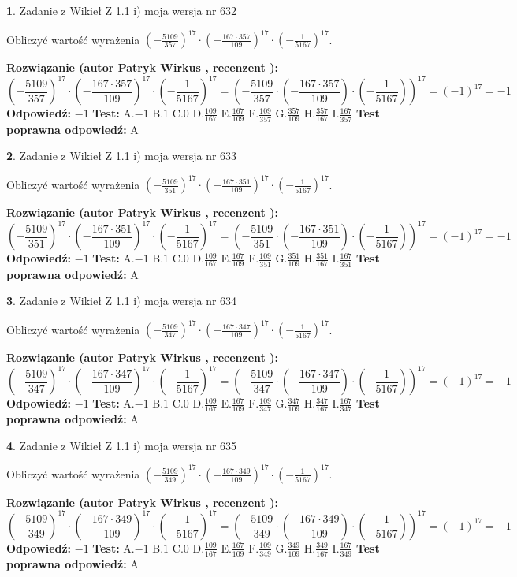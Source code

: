 \documentclass[12pt, a4paper]{article}
\theoremstyle{definition} %
\newtheorem{zad}{}
\newcommand{\zadStart}[1]{\begin{zad}#1\newline}
\newcommand{\zadStop}{\end{zad}}
\newcommand{\rozwStart}[2]{\noindent \textbf{Rozwiązanie (autor #1 , recenzent #2): }\newline}
\newcommand{\rozwStop}{\newline}
\newcommand{\odpStart}{\noindent \textbf{Odpowiedź:}\newline}
\newcommand{\odpStop}{\newline}
\newcommand{\testStart}{\noindent \textbf{Test:}\newline}
\newcommand{\testStop}{\newline}
\newcommand{\kluczStart}{\noindent \textbf{Test poprawna odpowiedź:}\newline}
\newcommand{\kluczStop}{\newline}
\begin{document}
\zadStart{Zadanie z Wikieł Z 1.1 i) moja wersja nr 632}

Obliczyć wartość wyrażenia $(-\frac{5109}{357})^{17} \cdot (-\frac{167 \cdot 357}{109})^{17} \cdot (-\frac{1}{5167})^{17}$.
\zadStop
\rozwStart{Patryk Wirkus}{}
$$(-\frac{5109}{357})^{17} \cdot (-\frac{167 \cdot 357}{109})^{17} \cdot (-\frac{1}{5167})^{17} = (-\frac{5109}{357} \cdot (-\frac{167 \cdot 357}{109}) \cdot (-\frac{1}{5167}))^{17} = (-1)^{17} = -1$$
\rozwStop
\odpStart
$-1$
\odpStop
\testStart
A.$-1$ B.$1$ C.$0$ D.$\frac{109}{167}$ E.$\frac{167}{109}$
F.$\frac{109}{357}$ G.$\frac{357}{109}$
H.$\frac{357}{167}$
I.$\frac{167}{357}$
\testStop
\kluczStart
A
\kluczStop



\zadStart{Zadanie z Wikieł Z 1.1 i) moja wersja nr 633}

Obliczyć wartość wyrażenia $(-\frac{5109}{351})^{17} \cdot (-\frac{167 \cdot 351}{109})^{17} \cdot (-\frac{1}{5167})^{17}$.
\zadStop
\rozwStart{Patryk Wirkus}{}
$$(-\frac{5109}{351})^{17} \cdot (-\frac{167 \cdot 351}{109})^{17} \cdot (-\frac{1}{5167})^{17} = (-\frac{5109}{351} \cdot (-\frac{167 \cdot 351}{109}) \cdot (-\frac{1}{5167}))^{17} = (-1)^{17} = -1$$
\rozwStop
\odpStart
$-1$
\odpStop
\testStart
A.$-1$ B.$1$ C.$0$ D.$\frac{109}{167}$ E.$\frac{167}{109}$
F.$\frac{109}{351}$ G.$\frac{351}{109}$
H.$\frac{351}{167}$
I.$\frac{167}{351}$
\testStop
\kluczStart
A
\kluczStop



\zadStart{Zadanie z Wikieł Z 1.1 i) moja wersja nr 634}

Obliczyć wartość wyrażenia $(-\frac{5109}{347})^{17} \cdot (-\frac{167 \cdot 347}{109})^{17} \cdot (-\frac{1}{5167})^{17}$.
\zadStop
\rozwStart{Patryk Wirkus}{}
$$(-\frac{5109}{347})^{17} \cdot (-\frac{167 \cdot 347}{109})^{17} \cdot (-\frac{1}{5167})^{17} = (-\frac{5109}{347} \cdot (-\frac{167 \cdot 347}{109}) \cdot (-\frac{1}{5167}))^{17} = (-1)^{17} = -1$$
\rozwStop
\odpStart
$-1$
\odpStop
\testStart
A.$-1$ B.$1$ C.$0$ D.$\frac{109}{167}$ E.$\frac{167}{109}$
F.$\frac{109}{347}$ G.$\frac{347}{109}$
H.$\frac{347}{167}$
I.$\frac{167}{347}$
\testStop
\kluczStart
A
\kluczStop



\zadStart{Zadanie z Wikieł Z 1.1 i) moja wersja nr 635}

Obliczyć wartość wyrażenia $(-\frac{5109}{349})^{17} \cdot (-\frac{167 \cdot 349}{109})^{17} \cdot (-\frac{1}{5167})^{17}$.
\zadStop
\rozwStart{Patryk Wirkus}{}
$$(-\frac{5109}{349})^{17} \cdot (-\frac{167 \cdot 349}{109})^{17} \cdot (-\frac{1}{5167})^{17} = (-\frac{5109}{349} \cdot (-\frac{167 \cdot 349}{109}) \cdot (-\frac{1}{5167}))^{17} = (-1)^{17} = -1$$
\rozwStop
\odpStart
$-1$
\odpStop
\testStart
A.$-1$ B.$1$ C.$0$ D.$\frac{109}{167}$ E.$\frac{167}{109}$
F.$\frac{109}{349}$ G.$\frac{349}{109}$
H.$\frac{349}{167}$
I.$\frac{167}{349}$
\testStop
\kluczStart
A
\kluczStop
\end{document}
